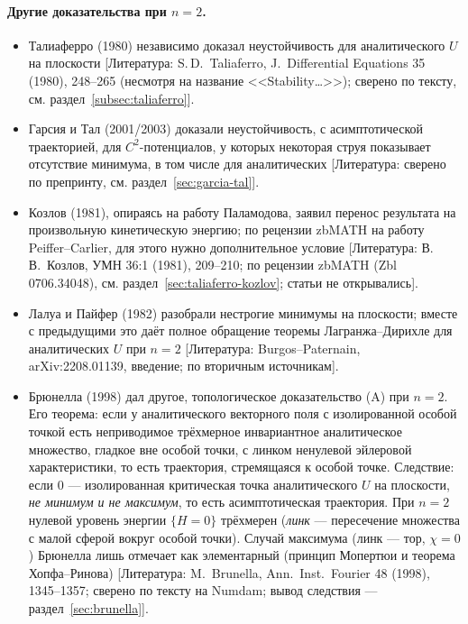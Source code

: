\documentclass[11pt,a4paper]{article}
\theoremstyle{definition}
\newcommand{\mk}[1]{\textsf{[#1]}}
\newcommand{\term}[1]{\emph{#1}}
\begin{document}
\paragraph{Другие доказательства при $n=2$.}
\begin{itemize}[leftmargin=*]
\item Талиаферро (1980) независимо доказал неустойчивость для аналитического $U$ на плоскости
\mk{Литература: S.\,D.~Taliaferro, J.~Differential Equations 35 (1980), 248--265 (несмотря на
название <<Stability…>>); сверено по тексту, см. раздел~\ref{subsec:taliaferro}}.
\item Гарсия и Тал (2001/2003) доказали неустойчивость, с асимптотической траекторией, для
$C^2$-потенциалов, у которых некоторая струя показывает отсутствие минимума, в том числе для
аналитических \mk{Литература: сверено по препринту, см. раздел~\ref{sec:garcia-tal}}.
\item Козлов (1981), опираясь на работу Паламодова, заявил перенос результата на произвольную
кинетическую энергию; по рецензии zbMATH на работу Peiffer--Carlier, для этого нужно дополнительное
условие \mk{Литература: В.\,В.~Козлов, УМН 36:1 (1981), 209--210; по рецензии zbMATH (Zbl
0706.34048), см. раздел~\ref{sec:taliaferro-kozlov}; статьи не открывались}.
\item Лалуа и Пайфер (1982) разобрали нестрогие минимумы на плоскости; вместе с предыдущими это
даёт полное обращение теоремы Лагранжа--Дирихле для аналитических $U$ при $n=2$
\mk{Литература: Burgos--Paternain, arXiv:2208.01139, введение; по вторичным источникам}.
\item Брюнелла (1998) дал другое, топологическое доказательство (A) при $n=2$. Его теорема: если у
аналитического векторного поля с изолированной особой точкой есть неприводимое трёхмерное
инвариантное аналитическое множество, гладкое вне особой точки, с линком ненулевой эйлеровой
характеристики, то есть траектория, стремящаяся к особой точке. Следствие: если $0$ ---
изолированная критическая точка аналитического $U$ на плоскости, \emph{не минимум и не
максимум}, то есть асимптотическая траектория. При $n=2$ нулевой уровень энергии $\{H=0\}$
трёхмерен (\term{линк} --- пересечение множества с малой сферой вокруг особой точки). Случай
максимума (линк --- тор, $\chi=0$) Брюнелла лишь отмечает как элементарный (принцип Мопертюи и
теорема Хопфа--Ринова) \mk{Литература: M.~Brunella, Ann.\ Inst.\ Fourier 48 (1998),
1345--1357; сверено по тексту на Numdam; вывод следствия --- раздел~\ref{sec:brunella}}.
\end{itemize}
\end{document}
